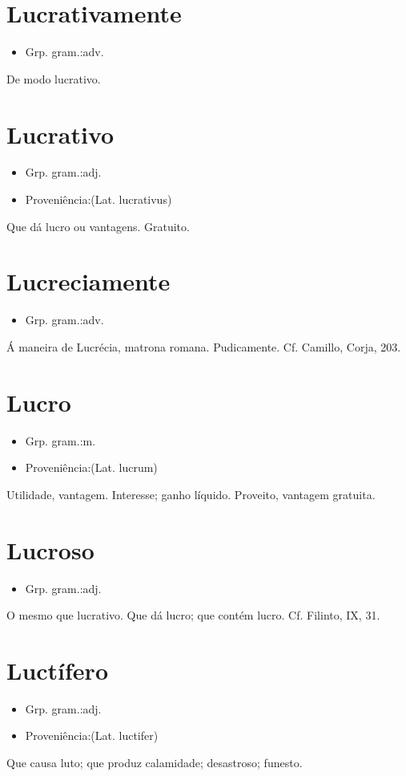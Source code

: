 \section{Lucrativamente}
\begin{itemize}
\item {Grp. gram.:adv.}
\end{itemize}
De modo lucrativo.
\section{Lucrativo}
\begin{itemize}
\item {Grp. gram.:adj.}
\end{itemize}
\begin{itemize}
\item {Proveniência:(Lat. \textunderscore lucrativus\textunderscore )}
\end{itemize}
Que dá lucro ou vantagens.
Gratuito.
\section{Lucreciamente}
\begin{itemize}
\item {Grp. gram.:adv.}
\end{itemize}
Á maneira de Lucrécia, matrona romana.
Pudicamente. Cf. Camillo, \textunderscore Corja\textunderscore , 203.
\section{Lucro}
\begin{itemize}
\item {Grp. gram.:m.}
\end{itemize}
\begin{itemize}
\item {Proveniência:(Lat. \textunderscore lucrum\textunderscore )}
\end{itemize}
Utilidade, vantagem.
Interesse; ganho líquido.
Proveito, vantagem gratuita.
\section{Lucroso}
\begin{itemize}
\item {Grp. gram.:adj.}
\end{itemize}
O mesmo que \textunderscore lucrativo\textunderscore .
Que dá lucro; que contém lucro. Cf. Filinto, IX, 31.
\section{Luctífero}
\begin{itemize}
\item {Grp. gram.:adj.}
\end{itemize}
\begin{itemize}
\item {Proveniência:(Lat. \textunderscore luctifer\textunderscore )}
\end{itemize}
Que causa luto; que produz calamidade; desastroso; funesto.
